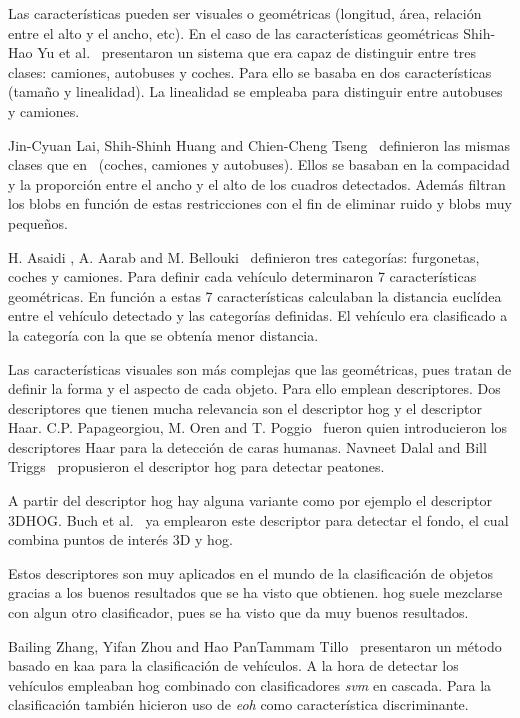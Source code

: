 Las características pueden ser visuales o geométricas (longitud, área, relación  entre el alto y el ancho, etc). En el caso de las características geométricas Shih-Hao Yu et al.~\cite{an_Automatic_traffic} presentaron un sistema que era capaz de distinguir entre tres clases: camiones, autobuses y coches. Para ello se basaba en dos características (tamaño y linealidad). La linealidad se empleaba para distinguir entre autobuses y camiones.

Jin-Cyuan Lai, Shih-Shinh Huang and Chien-Cheng Tseng~\cite{image_based_vehicle} definieron las mismas clases que en ~\cite{an_Automatic_traffic}(coches, camiones y autobuses). Ellos se basaban en la compacidad y la proporción entre el ancho y el alto de los cuadros detectados. Además filtran los blobs en función de estas restricciones con el fin de eliminar ruido y blobs muy pequeños.

H. Asaidi , A. Aarab and M. Bellouki~\cite{shadow_elimination} definieron tres categorías: furgonetas, coches y camiones. Para definir cada vehículo determinaron 7 características geométricas. En función a estas 7 características calculaban la distancia euclídea entre el vehículo detectado y las categorías definidas. El vehículo era clasificado a la categoría con la que se obtenía menor distancia.

Las características visuales son más complejas que las geométricas, pues tratan de definir la forma y el aspecto de cada objeto. Para ello emplean descriptores. Dos descriptores que tienen mucha relevancia son el descriptor \acrfull{hog} y el descriptor Haar. C.P. Papageorgiou, M. Oren and T. Poggio~\cite{haar_paper} fueron quien introducieron los descriptores Haar para la detección de caras humanas. Navneet Dalal and Bill Triggs~\cite{hog_paper} propusieron el descriptor \acrshort{hog} para detectar peatones.

A partir del descriptor \acrshort{hog} hay alguna variante como por ejemplo el descriptor 3DHOG. Buch et al.~\cite{3dhog_article} ya emplearon este descriptor para detectar el fondo, el cual combina puntos de interés 3D y \acrshort{hog}.

Estos descriptores son muy aplicados en el mundo de la clasificación de objetos gracias a los buenos resultados que se ha visto que obtienen. \acrshort{hog} suele mezclarse con algun otro clasificador, pues se ha visto que da muy buenos resultados.

Bailing Zhang, Yifan Zhou and Hao PanTammam Tillo~\cite{hybrid_model} presentaron un método basado en \acrfull{kaa} para la clasificación de vehículos. A la hora de detectar los vehículos empleaban \acrshort{hog} combinado con clasificadores \textit{\acrfull{svm}} en cascada. Para la clasificación también hicieron uso de \textit{\acrfull{eoh}} como característica discriminante.

